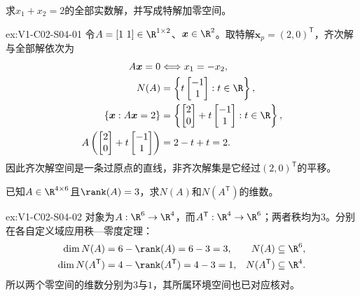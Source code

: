 \begin{SLChapterExercisePairSection}
\begin{exercise}[方程组全部解]\label{ex:V1-C02-S04-01}
求$x_1+x_2=2$的全部实数解，并写成特解加零空间。
\end{exercise}
\label{sol:V1-C02-S04-01}
\begin{chapterexercisesolution}{ex:V1-C02-S04-01}
令$A=[1\ 1]\in\R^{1\times2}$、$\boldsymbol{x}\in\R^2$。取特解$\boldsymbol{x}_p=(2,0)^{\mathsf T}$，齐次解与全部解依次为
\[
\begin{aligned}
A\boldsymbol{x}=0
&\Longleftrightarrow x_1=-x_2,\\
N(A)&=\left\{t\begin{bmatrix}-1\\1\end{bmatrix}:t\in\R\right\},\\
\{\boldsymbol{x}:A\boldsymbol{x}=2\}
&=\left\{\begin{bmatrix}2\\0\end{bmatrix}
+t\begin{bmatrix}-1\\1\end{bmatrix}:t\in\R\right\},\\
A\left(\begin{bmatrix}2\\0\end{bmatrix}
+t\begin{bmatrix}-1\\1\end{bmatrix}\right)&=2-t+t=2.
\end{aligned}
\]
因此齐次解空间是一条过原点的直线，非齐次解集是它经过$(2,0)^{\mathsf T}$的平移。
\end{chapterexercisesolution}

\begin{exercise}[秩与零度]\label{ex:V1-C02-S04-02}
已知$A\in\R^{4\times6}$且$\rank(A)=3$，求$N(A)$和$N(A^{\mathsf T})$的维数。
\end{exercise}
\label{sol:V1-C02-S04-02}
\begin{chapterexercisesolution}{ex:V1-C02-S04-02}
对象为$A:\R^6\to\R^4$，而$A^{\mathsf T}:\R^4\to\R^6$；两者秩均为$3$。分别在各自定义域应用秩—零度定理：
\[
\begin{aligned}
\dim N(A)&=6-\rank(A)=6-3=3,
&N(A)&\subseteq\R^6,\\
\dim N(A^{\mathsf T})
&=4-\rank(A^{\mathsf T})=4-3=1,
&N(A^{\mathsf T})&\subseteq\R^4.
\end{aligned}
\]
所以两个零空间的维数分别为$3$与$1$，其所属环境空间也已对应核对。
\end{chapterexercisesolution}


\end{SLChapterExercisePairSection}
